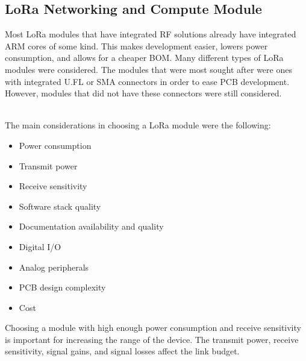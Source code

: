 \subsection{LoRa Networking and Compute Module} 
Most LoRa modules that have integrated RF solutions already have integrated ARM
cores of some kind. This makes development easier, lowers power consumption, and
allows for a cheaper BOM. Many different types of LoRa modules were
considered. The modules that were most sought after were ones with integrated
U.FL or SMA connectors in order to ease PCB development. However, modules that
did not have these connectors were still considered.

\noindent
\\The main considerations in choosing a LoRa module were the following:
{
  \begin{itemize}
    \item Power consumption
    \item Transmit power
    \item Receive sensitivity
    \item Software stack quality
    \item Documentation availability and quality
    \item Digital I/O
    \item Analog peripherals
    \item PCB design complexity
    \item Cost
  \end{itemize}
}

Choosing a module with high enough power consumption and receive sensitivity is
important for increasing the range of the device. The transmit power, receive
sensitivity, signal gains, and signal losses affect the link budget.

